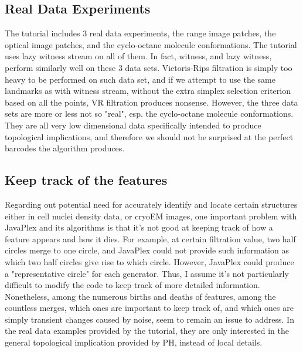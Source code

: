 \documentclass[10pt,a4paper]{article}
\begin{document}
\subsection{Real Data Experiments}
The tutorial includes 3 real data experiments, the range image patches, the optical image patches, and the cyclo-octane molecule conformations. The tutorial uses lazy witness stream on all of them. In fact, witness, and lazy witness, perform similarly well on these 3 data sets. Vietoris-Rips filtration is simply too heavy to be performed on such data set, and if we attempt to use the same landmarks as with witness stream, without the extra simplex selection criterion based on all the points, VR filtration produces nonsense. However, the three data sets are more or less not so "real", esp. the cyclo-octane molecule conformations. They are all very low dimensional data specifically intended to produce topological implications, and therefore we should not be surprised at the perfect barcodes the algorithm produces.

\subsection{Keep track of the features}
Regarding out potential need for accurately identify and locate certain structures either in cell nuclei density data, or cryoEM images, one important problem with JavaPlex and its algorithms is that it's not good at keeping track of how a feature appears and how it dies. For example, at certain filtration value, two half circles merge to one circle, and JavaPlex could not provide such information as which two half circles give rise to which circle. However, JavaPlex could produce a "representative circle" for each generator. Thus, I assume it's not particularly difficult to modify the code to keep track of more detailed information. Nonetheless, among the numerous births and deaths of features, among the countless merges, which ones are important to keep track of, and which ones are simply transient changes caused by noise, seem to remain an issue to address. In the real data examples provided by the tutorial, they are only interested in the general topological implication provided by PH, instead of local details.
\end{document}
